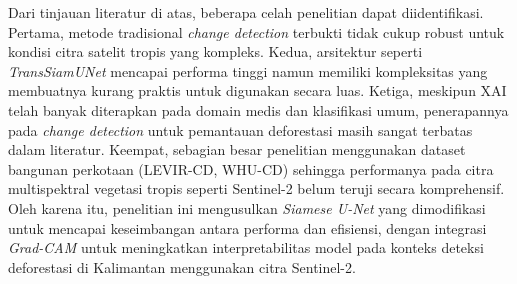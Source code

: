 Dari tinjauan literatur di atas, beberapa celah penelitian dapat diidentifikasi. Pertama, metode tradisional \textit{change detection} terbukti tidak cukup robust untuk kondisi citra satelit tropis yang kompleks. Kedua, arsitektur seperti \textit{TransSiamUNet} mencapai performa tinggi namun memiliki kompleksitas yang membuatnya kurang praktis untuk digunakan secara luas. Ketiga, meskipun XAI telah banyak diterapkan pada domain medis dan klasifikasi umum, penerapannya pada \textit{change detection} untuk pemantauan deforestasi masih sangat terbatas dalam literatur. Keempat, sebagian besar penelitian menggunakan dataset bangunan perkotaan (LEVIR-CD, WHU-CD) sehingga performanya pada citra multispektral vegetasi tropis seperti Sentinel-2 belum teruji secara komprehensif.
Oleh karena itu, penelitian ini mengusulkan \textit{Siamese U-Net} yang dimodifikasi untuk mencapai keseimbangan antara performa dan efisiensi, dengan integrasi \textit{Grad-CAM} untuk meningkatkan interpretabilitas model pada konteks deteksi deforestasi di Kalimantan menggunakan citra Sentinel-2.

